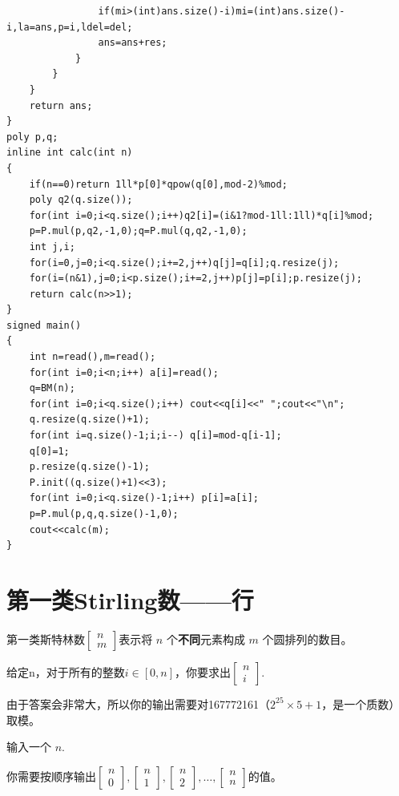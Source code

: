 \begin{verbatim}
                if(mi>(int)ans.size()-i)mi=(int)ans.size()-i,la=ans,p=i,ldel=del;
                ans=ans+res;
            }
        }
    }
    return ans;
}
poly p,q;
inline int calc(int n)
{
    if(n==0)return 1ll*p[0]*qpow(q[0],mod-2)%mod;
    poly q2(q.size());
    for(int i=0;i<q.size();i++)q2[i]=(i&1?mod-1ll:1ll)*q[i]%mod;
    p=P.mul(p,q2,-1,0);q=P.mul(q,q2,-1,0);
    int j,i;
    for(i=0,j=0;i<q.size();i+=2,j++)q[j]=q[i];q.resize(j);
    for(i=(n&1),j=0;i<p.size();i+=2,j++)p[j]=p[i];p.resize(j);
    return calc(n>>1);
}
signed main()
{
    int n=read(),m=read();
    for(int i=0;i<n;i++) a[i]=read();
    q=BM(n);
    for(int i=0;i<q.size();i++) cout<<q[i]<<" ";cout<<"\n";
    q.resize(q.size()+1);
    for(int i=q.size()-1;i;i--) q[i]=mod-q[i-1];
    q[0]=1;
    p.resize(q.size()-1);
    P.init((q.size()+1)<<3);
    for(int i=0;i<q.size()-1;i++) p[i]=a[i];
    p=P.mul(p,q,q.size()-1,0);
    cout<<calc(m);
}
\end{verbatim}

\section{第一类Stirling数——行}
\par \noindent 第一类斯特林数$\begin{bmatrix}n\\ m\end{bmatrix}$表示将 $n$ 个\textbf{不同}元素构成 $m$ 个圆排列的数目。
~\\
\par \noindent 给定n，对于所有的整数$i\in[0,n]$，你要求出$\begin{bmatrix}n\\ i\end{bmatrix}$.
~\\
\par \noindent 由于答案会非常大，所以你的输出需要对167772161（$2^{25}\times 5+1$，是一个质数）取模。
~\\
\par \noindent 输入一个 $n$.
~\\
\par \noindent 你需要按顺序输出$\begin{bmatrix}n\\ 0\end{bmatrix},\begin{bmatrix}n\\ 1\end{bmatrix},\begin{bmatrix}n\\ 2\end{bmatrix},\dots,\begin{bmatrix}n\\ n\end{bmatrix}$的值。

